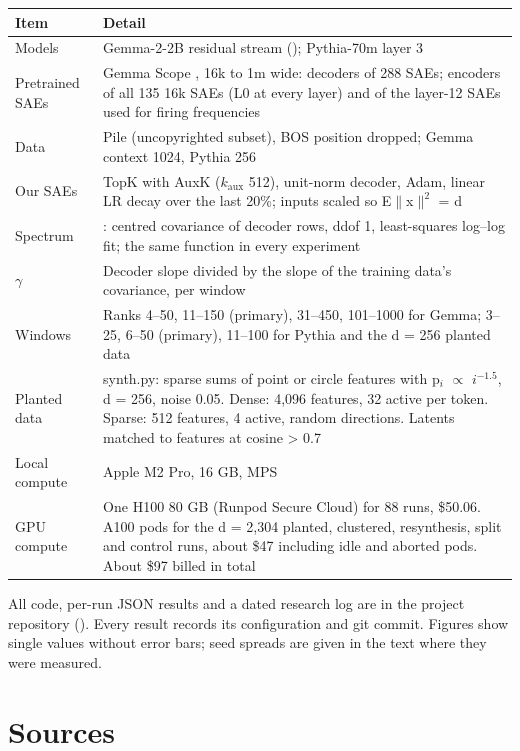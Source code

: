 \documentclass[11pt]{article}
\begin{document}
{\small
\begin{xltabular}{\textwidth}{l>{\raggedright\arraybackslash}X}
\toprule
\textbf{Item} & \textbf{Detail} \\
\midrule
\endhead
\bottomrule
\endlastfoot
Models & Gemma-2-2B residual stream (); Pythia-70m layer 3 \\
Pretrained SAEs & Gemma Scope , 16k to 1m wide: decoders of 288 SAEs; encoders of all 135 16k SAEs (L0 at every layer) and of the layer-12 SAEs used for firing frequencies \\
Data & Pile (uncopyrighted subset), BOS position dropped; Gemma context 1024, Pythia 256 \\
Our SAEs & TopK with AuxK ($k_{\mathrm{aux}}$ 512), unit-norm decoder, Adam, linear LR decay over the last 20\%; inputs scaled so E$\|$x$\|^2$ = d \\
Spectrum & : centred covariance of decoder rows, ddof 1, least-squares log--log fit; the same function in every experiment \\
$\gamma$ & Decoder slope divided by the slope of the training data's covariance, per window \\
Windows & Ranks 4--50, 11--150 (primary), 31--450, 101--1000 for Gemma; 3--25, 6--50 (primary), 11--100 for Pythia and the d = 256 planted data \\
Planted data & synth.py: sparse sums of point or circle features with p$_i$ $\propto$ $i^{-1.5}$, d = 256, noise 0.05. Dense: 4,096 features, 32 active per token. Sparse: 512 features, 4 active, random directions. Latents matched to features at cosine > 0.7 \\
Local compute & Apple M2 Pro, 16 GB, MPS \\
GPU compute & One H100 80 GB (Runpod Secure Cloud) for 88 runs, \$50.06. A100 pods for the d = 2,304 planted, clustered, resynthesis, split and control runs, about \$47 including idle and aborted pods. About \$97 billed in total \\
\end{xltabular}}

All code, per-run JSON results and a dated research log are in the project repository (). Every result records its configuration and git commit. Figures show single values without error bars; seed spreads are given in the text where they were measured.

\section{Sources}
\end{document}
